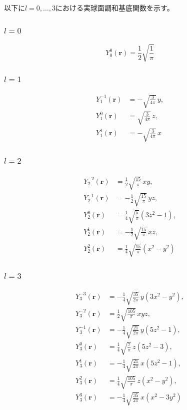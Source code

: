 \documentclass[dvipdfmx]{jlreq}
\begin{document}
以下に$l=0,\ldots,3$における実球面調和基底関数を示す。
\subsubsection*{$l=0$}
\begin{equation}
    Y_0^0(\bm{r}) = \frac{1}{2}\sqrt{\frac{1}{\pi}}
\end{equation}

\subsubsection*{$l=1$}
\begin{equation}
\begin{aligned}
    Y_1^{-1}(\bm{r}) &= -\sqrt{\frac{3}{4\pi}}\,y, \\
    Y_1^0(\bm{r}) &= \sqrt{\frac{3}{4\pi}}\,z, \\
    Y_1^1(\bm{r}) &= -\sqrt{\frac{3}{4\pi}}\,x
\end{aligned}
\end{equation}

\subsubsection*{$l=2$}
\begin{equation}
\begin{aligned}
    Y_2^{-2}(\bm{r}) &= \frac{1}{2}\sqrt{\frac{15}{\pi}}\,xy, \\
    Y_2^{-1}(\bm{r}) &= -\frac{1}{2}\sqrt{\frac{15}{\pi}}\,yz, \\
    Y_2^0(\bm{r}) &= \frac{1}{4}\sqrt{\frac{5}{\pi}} \left(3z^2-1\right), \\
    Y_2^1(\bm{r}) &= -\frac{1}{2}\sqrt{\frac{15}{\pi}}\,xz, \\
    Y_2^2(\bm{r}) &= \frac{1}{4}\sqrt{\frac{15}{\pi}} \left(x^2-y^2\right)
\end{aligned}
\end{equation}

\subsubsection*{$l=3$}
\begin{equation}
\begin{aligned}
    Y_3^{-3}(\bm{r}) &= -\frac{1}{4}\sqrt{\frac{35}{2\pi}}\, y\left(3x^2-y^2\right), \\
    Y_3^{-2}(\bm{r}) &= \frac{1}{2}\sqrt{\frac{105}{\pi}}\, xyz, \\
    Y_3^{-1}(\bm{r}) &= -\frac{1}{4}\sqrt{\frac{21}{2\pi}}\, y\left(5z^2-1\right), \\
    Y_3^0(\bm{r}) &= \frac{1}{4}\sqrt{\frac{7}{\pi}}\, z\left(5z^2-3\right), \\
    Y_3^1(\bm{r}) &= -\frac{1}{4}\sqrt{\frac{21}{2\pi}}\, x\left(5z^2-1\right), \\
    Y_3^2(\bm{r}) &= \frac{1}{4}\sqrt{\frac{105}{\pi}}\, z\left(x^2-y^2\right), \\
    Y_3^3(\bm{r}) &= -\frac{1}{4}\sqrt{\frac{35}{2\pi}}\, x\left(x^2-3y^2\right)
\end{aligned}
\label{eq:real_sh_degree_3}
\end{equation}
\end{document}
